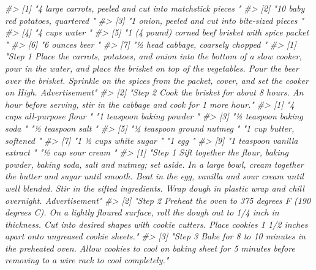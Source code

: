 \documentclass[
]{krantz}
\makeatletter
\newenvironment{Shaded}{\begin{snugshade}}{\end{snugshade}}
\newcommand{\CommentTok}[1]{\textcolor[rgb]{0.37,0.37,0.37}{\textit{#1}}}
\newenvironment{kframe}{%
\medskip{}
\setlength{\fboxsep}{.8em}
 \def\at@end@of@kframe{}%
 \ifinner\ifhmode%
  \def\at@end@of@kframe{\end{minipage}}%
  \begin{minipage}{\columnwidth}%
 \fi\fi%
 \def\FrameCommand##1{\hskip\@totalleftmargin \hskip-\fboxsep
 \colorbox{shadecolor}{##1}\hskip-\fboxsep
     \hskip-\linewidth \hskip-\@totalleftmargin \hskip\columnwidth}%
 \MakeFramed {\advance\hsize-\width
   \@totalleftmargin\z@ \linewidth\hsize
   \@setminipage}}%
 {\par\unskip\endMakeFramed%
 \at@end@of@kframe}
\renewenvironment{Shaded}{\begin{kframe}}{\end{kframe}}
\makeatother
\begin{document}
\begin{Shaded}
\begin{Highlighting}[]
\CommentTok{\#\textgreater{} [1] "4 large carrots, peeled and cut into matchstick pieces "}
\CommentTok{\#\textgreater{} [2] "10 baby red potatoes, quartered "                       }
\CommentTok{\#\textgreater{} [3] "1 onion, peeled and cut into bite{-}sized pieces "        }
\CommentTok{\#\textgreater{} [4] "4 cups water "                                          }
\CommentTok{\#\textgreater{} [5] "1 (4 pound) corned beef brisket with spice packet "     }
\CommentTok{\#\textgreater{} [6] "6 ounces beer "                                         }
\CommentTok{\#\textgreater{} [7] "½ head cabbage, coarsely chopped "                      }
\CommentTok{\#\textgreater{} [1] "Step 1   Place the carrots, potatoes, and onion into the bottom of a slow cooker, pour in the water, and place the brisket on top of the vegetables. Pour the beer over the brisket. Sprinkle on the spices from the packet, cover, and set the cooker on High.    Advertisement"}
\CommentTok{\#\textgreater{} [2] "Step 2   Cook the brisket for about 8 hours. An hour before serving, stir in the cabbage and cook for 1 more hour."                                                                                                                                                              }
\CommentTok{\#\textgreater{}  [1] "4 cups all{-}purpose flour "   "1 teaspoon baking powder "  }
\CommentTok{\#\textgreater{}  [3] "½ teaspoon baking soda "     "½ teaspoon salt "           }
\CommentTok{\#\textgreater{}  [5] "¼ teaspoon ground nutmeg "   "1 cup butter, softened "    }
\CommentTok{\#\textgreater{}  [7] "1 ½ cups white sugar "       "1 egg "                     }
\CommentTok{\#\textgreater{}  [9] "1 teaspoon vanilla extract " "½ cup sour cream "          }
\CommentTok{\#\textgreater{} [1] "Step 1   Sift together the flour, baking powder, baking soda, salt and nutmeg; set aside. In a large bowl, cream together the butter and sugar until smooth. Beat in the egg, vanilla and sour cream until well blended. Stir in the sifted ingredients. Wrap dough in plastic wrap and chill overnight.    Advertisement"}
\CommentTok{\#\textgreater{} [2] "Step 2   Preheat the oven to 375 degrees F (190 degrees C). On a lightly floured surface, roll the dough out to 1/4 inch in thickness. Cut into desired shapes with cookie cutters. Place cookies 1 1/2 inches apart onto ungreased cookie sheets."                                                                       }
\CommentTok{\#\textgreater{} [3] "Step 3   Bake for 8 to 10 minutes in the preheated oven. Allow cookies to cool on baking sheet for 5 minutes before removing to a wire rack to cool completely."                                                                                                                                                          }

\end{Highlighting}
\end{Shaded}
\end{document}
